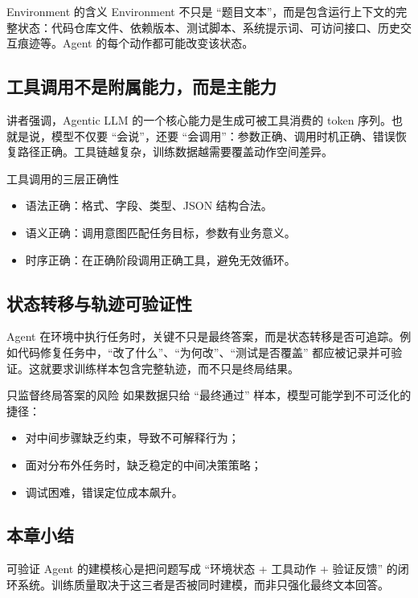 \documentclass[a4paper]{article}
\begin{document}
\begin{knowledgebox}{Environment 的含义}
Environment 不只是 ``题目文本''，而是包含运行上下文的完整状态：代码仓库文件、依赖版本、测试脚本、系统提示词、可访问接口、历史交互痕迹等。Agent 的每个动作都可能改变该状态。
\end{knowledgebox}

\subsection{工具调用不是附属能力，而是主能力}
讲者强调，Agentic LLM 的一个核心能力是生成可被工具消费的 token 序列。也就是说，模型不仅要 ``会说''，还要 ``会调用''：参数正确、调用时机正确、错误恢复路径正确。工具链越复杂，训练数据越需要覆盖动作空间差异。

\begin{importantbox}{工具调用的三层正确性}
\begin{itemize}
    \item 语法正确：格式、字段、类型、JSON 结构合法。
    \item 语义正确：调用意图匹配任务目标，参数有业务意义。
    \item 时序正确：在正确阶段调用正确工具，避免无效循环。
\end{itemize}
\end{importantbox}

\subsection{状态转移与轨迹可验证性}
Agent 在环境中执行任务时，关键不只是最终答案，而是状态转移是否可追踪。例如代码修复任务中，``改了什么''、``为何改''、``测试是否覆盖'' 都应被记录并可验证。这就要求训练样本包含完整轨迹，而不只是终局结果。

\begin{warningbox}{只监督终局答案的风险}
如果数据只给 ``最终通过'' 样本，模型可能学到不可泛化的捷径：
\begin{itemize}
    \item 对中间步骤缺乏约束，导致不可解释行为；
    \item 面对分布外任务时，缺乏稳定的中间决策策略；
    \item 调试困难，错误定位成本飙升。
\end{itemize}
\end{warningbox}

\subsection{本章小结}
可验证 Agent 的建模核心是把问题写成 ``环境状态 + 工具动作 + 验证反馈'' 的闭环系统。训练质量取决于这三者是否被同时建模，而非只强化最终文本回答。
\end{document}

